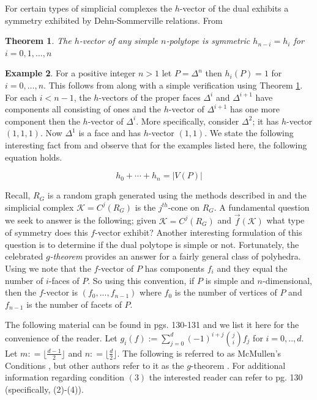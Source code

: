 \documentclass[oneside,12pt]{amsart}
\newtheorem{Theorem}{Theorem}[section]
\theoremstyle{definition}
\newtheorem{Example}[Theorem]{Example}
\numberwithin{equation}{section}
\begin{document}
For certain types of simplicial complexes the $h$-vector of the dual exhibits a symmetry exhibited by Dehn-Sommerville relations.   From \cite{BP1}

\begin{Theorem}\label{Dehn}
The $h$-vector of any simple $n$-polytope is symmetric $h_{n-i} = h_i$ for $i = 0,1,\ldots,n$
\end{Theorem}


\begin{Example}
For a positive integer $n > 1$ let  $P = \Delta^n$ then $h_i(P) = 1$ for $i =0,\ldots,n$.  This follows from \cite{BP1} along with a simple verification using Theorem \ref{Dehn}. For each $i < n-1$, the $h$-vectors of the proper faces $ \Delta^i$ and $ \Delta^{i+1}$ have components all consisting of ones and the $h$-vector of $ \Delta^{i+1}$ has one more component then the $h$-vector of $ \Delta^i$.  More specifically, consider $\Delta^2$; it has $h$-vector $(1,1,1)$.  Now $\Delta^1$ is a face and has $h$-vector $(1,1)$.  We state the following interesting fact from \cite{DJ} and observe that for the examples listed here, the following equation holds.

$$h_0 + \cdots+ h_n = |V(P)|$$

\end{Example}

Recall, $R_G$ is a random graph generated using the methods described in \cite{ALDH} and the simplicial complex $\mathcal{K} = C^j(R_G)$ is the $j^{th}$-cone on $R_G$. A fundamental question we seek to answer is the following; given $\mathcal{K} = C^j(R_G)$ and $\overrightarrow{f}(\mathcal{K})$ what type of symmetry does this $f$-vector exhibit? Another interesting formulation of this question is to determine if the dual polytope is simple or not.  Fortunately, the celebrated \textit{$g$-theorem} provides an answer for a fairly general class of polyhedra. Using \cite{B} we note that the $f$-vector of $P$ has components $f_i$ and they equal the number of $i$-faces of $P$.  So using this convention, if $P$ is simple and $n$-dimensional, then the $f$-vector is $(f_0,...,f_{n-1})$ where $f_0$ is the number of vertices of $P$ and $f_{n-1}$ is the number of facets of $P$.

The following material can be found in \cite{B} pgs. 130-131 and we list it here for the convenience of the reader.  Let $g_i(f) := \sum_{j=0}^d (-1)^{i+j}\binom{j}{i}f_j$ for $i = 0,..,d$.  Let $m: = \lfloor \frac{d-1}{2}\rfloor$ and $n: = \lfloor \frac{d}{2} \rfloor$.  The following is referred to as McMullen's Conditions \cite{B}, but other authors refer to it as the $g$-theorem \cite{BP1}.  For additional information regarding condition $(3)$ the interested reader can refer to \cite{B} pg. 130 (specifically, (2)-(4)).
\end{document}
